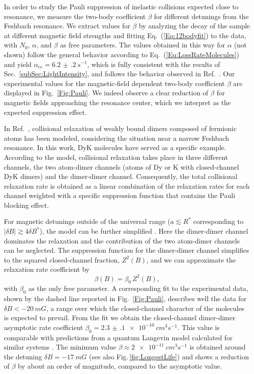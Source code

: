 In order to study the Pauli suppression of inelastic collisions expected close to resonance, we measure the two-body coefficient $\beta$ for different detunings from the Feshbach resonance. We extract values for $\beta$ by analyzing the decay of the sample at different magnetic field strengths and fitting Eq.~(\ref{Eq:12bodyfit}) to the data, with $N_0$, $\alpha$, and $\beta$ as free parameters. 
The values obtained in this way for $\alpha$ (not shown) follow the general behavior according to Eq.~(\ref{Eq:LossRateMolecules}) and yield $\alpha_{\mathrm{cc}} = \SI{6.2(2)}{s^{-1}}$, which is fully consistent with the results of Sec.~\ref{subSec:LightIntensity}, and follows the behavior observed in Ref.~\cite{Soave2023otf}. Our experimental values for the magnetic-field dependent two-body coefficient $\beta$ are displayed in Fig.~\ref{Fig:Pauli}. We indeed observe a clear reduction of $\beta$ for magnetic fields approaching the resonance center, which we interpret as the expected suppression effect. 


In Ref.~\cite{Jag2016lof}, collisional relaxation of weakly bound dimers composed of fermionic atoms has been modeled, considering the situation near a narrow Feshbach resonance. In this work, DyK molecules have served as a specific example. According to the model, collisional relaxation takes place in three different channels, the two atom-dimer channels (atoms of Dy or K with closed-channel DyK dimers) and the dimer-dimer channel. Consequently, the total collisional relaxation rate is obtained as a linear combination of the relaxation rates for each channel weighted with a specific suppression function that contains the Pauli blocking effect.

For magnetic detunings outside of the universal range ($a\lesssim R^*$ corresponding to $|\delta B| \gtrsim 4\delta B^*$), the model can be further simplified {\cite{Jag2016lof}}. Here the dimer-dimer channel dominates the relaxation and the contribution of the two atom-dimer channels can be neglected. The suppression function for the dimer-dimer channel simplifies to the squared closed-channel fraction, $Z^2(B)$, and we can approximate the relaxation rate coefficient by
\begin{equation}
	\beta(B)=\beta_0\,Z^2(B),
	\label{eq:FitPauli}
\end{equation}
with $\beta_0$ as the only free parameter. A corresponding fit to the experimental data, shown by the dashed line reported in Fig.~\ref{Fig:Pauli}, describes well the data for $\delta B< -\SI{20}{mG}$, a range over which the closed-channel character of the molecules is expected to prevail. From the fit we obtain the closed-channel dimer-dimer asymptotic rate coefficient $\beta_0=\SI{2.3(1)e-10}{cm^3s^{-1}}$. This value is comparable with predictions from a quantum Langevin model calculated for similar systems \cite{Gao2010umf, Julienne2011uuc, Quenemer2011uiu}. The minimum value $\beta\approx\SI{2e-11}{cm^3s^{-1}}$ is obtained around  the detuning $\delta B=-\SI{17}{mG}$ (see also Fig.\,\ref{fig:LongestLife}) and shows a reduction of $\beta$ by about an order of magnitude, compared to the asymptotic value.

